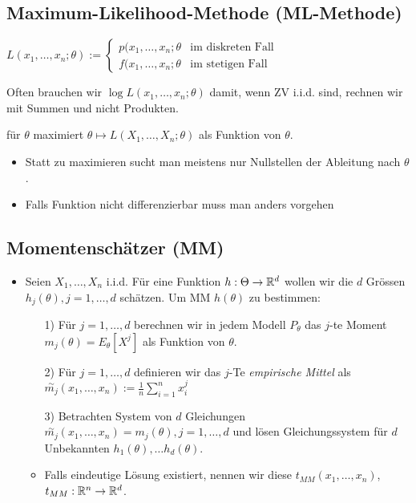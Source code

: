 \subsection{Maximum-Likelihood-Methode (ML-Methode)}
\begin{itemize}
     $L(x_1, \dots, x_n; \theta) :=
\begin{cases}
    p(x_1, \dots, x_n; \theta &\text{im diskreten Fall}\\
    f(x_1, \dots, x_n; \theta &\text{im stetigen Fall}
\end{cases}$
        \begin{itemize}
             Often brauchen wir $\log L(x_1, \dots, x_n;\theta)$ damit, wenn ZV i.i.d. sind, rechnen wir mit Summen und nicht Produkten.
        \end{itemize}
         für $\theta$ maximiert $\theta \mapsto L(X_1, \dots, X_n;\theta)$ als Funktion von $\theta$.
        \begin{itemize}
            \item Statt zu maximieren sucht man meistens nur Nullstellen der Ableitung nach $\theta$.
            \item Falls Funktion nicht differenzierbar muss man anders vorgehen
        \end{itemize}
\end{itemize}

\subsection{Momentenschätzer (MM)}
\begin{itemize}
    \item Seien $X_1, \dots, X_n$ i.i.d. Für eine Funktion $h: \Theta \to \mathbb{R}^d$ wollen wir die $d$ Grössen $h_j(\theta), j = 1, \dots, d$ schätzen. Um MM $h(\theta)$ zu bestimmen:
    \begin{itemize}
        \item[1)] Für $j = 1, \dots, d$ berechnen wir in jedem Modell $P_\theta$ das $j$-te Moment $m_j(\theta) = E_\theta[X^j]$ als Funktion von $\theta$.
        \item[2)] Für $j = 1, \dots, d$ definieren wir das $j$-Te \textit{empirische Mittel} als $\overset{\sim}{m_j}(x_1, \dots, x_n) := \frac{1}{n} \sum_{i=1}^{n} x_i^j$
        \item[3)] Betrachten System von $d$ Gleichungen $\overset{\sim}{m_j}(x_1, \dots, x_n) = m_j(\theta), j = 1, \dots, d$ und lösen Gleichungssystem für $d$ Unbekannten $h_1(\theta), \dots h_d(\theta)$.
        \item Falls eindeutige Lösung existiert, nennen wir diese $t_{MM}(x_1, \dots, x_n)$, $t_{MM}: \mathbb{R}^n \to \mathbb{R}^d$.
    \end{itemize}
\end{itemize}

